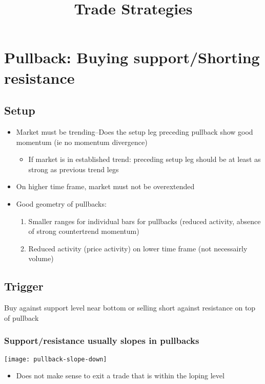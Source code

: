 \documentclass{../notes}
\title{Trade Strategies}
\begin{document}
\maketitle

\section{Pullback: Buying support/Shorting resistance}
\subsection{Setup}
\begin{itemize}
  \item Market must be trending--Does the setup leg preceding pullback show good momentum (ie no momentum divergence)
  \begin{itemize}
    \item If market is in established trend: preceding setup leg should be at least as strong as previous trend legs
  \end{itemize}
  \item On higher time frame, market must not be overextended
  \item Good geometry of pullbacks:
  \begin{enumerate}
    \item Smaller ranges for individual bars for pullbacks (reduced activity, absence of strong countertrend momentum)
    \item Reduced activity (price activity) on lower time frame (not necessairly volume)
  \end{enumerate}
\end{itemize}
\subsection{Trigger}
Buy against support level near bottom or selling short against resistance on top of pullback
\subsubsection{Support/resistance usually slopes in pullbacks}
\texttt{[image: pullback-slope-down]}
\begin{itemize}
  \item Does not make sense to exit a trade that is within the loping level
\end{itemize}
\end{document}
